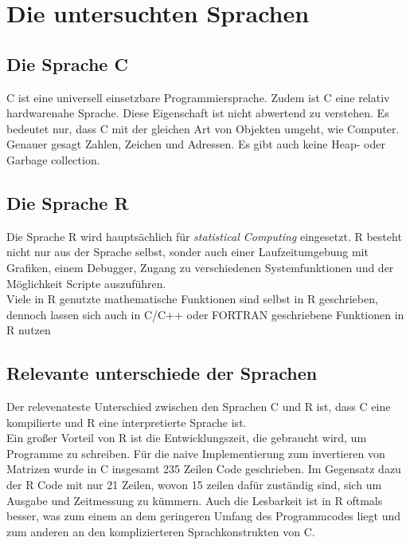 %
\chapter{Die untersuchten Sprachen}
\section{Die Sprache C}
C ist eine universell einsetzbare Programmiersprache. Zudem ist C eine relativ hardwarenahe Sprache. Diese Eigenschaft ist nicht abwertend zu verstehen. Es bedeutet nur, dass C mit der gleichen Art von Objekten umgeht, wie Computer. Genauer gesagt Zahlen, Zeichen und Adressen. Es gibt auch keine Heap- oder Garbage collection.\cite{Kernighan.1988}
\section{Die Sprache R}
Die Sprache R wird hauptsächlich für \emph{statistical Computing} eingesetzt. R besteht nicht nur aus der Sprache selbst, sonder auch einer Laufzeitumgebung mit Grafiken, einem Debugger, Zugang zu verschiedenen Systemfunktionen und der Möglichkeit Scripte auszuführen.\\
Viele in R genutzte mathematische Funktionen sind selbst in R geschrieben, dennoch lassen sich auch in C/C++ oder FORTRAN geschriebene Funktionen in R nutzen\cite{.05.10.2017}

\section{Relevante unterschiede der Sprachen}
Der relevenateste Unterschied zwischen den Sprachen C und R ist, dass C eine kompilierte und R eine interpretierte Sprache ist.\\
Ein großer Vorteil von R ist die Entwicklungszeit, die gebraucht wird, um Programme zu schreiben.
Für die naive Implementierung zum invertieren von Matrizen wurde in C insgesamt 235 Zeilen Code geschrieben. Im Gegensatz dazu der R Code mit nur 21 Zeilen, wovon 15 zeilen dafür zuständig sind, sich um Ausgabe und Zeitmessung zu kümmern. Auch die Lesbarkeit ist in R oftmals besser, was zum einem an dem geringeren Umfang des Programmcodes liegt und zum anderen an den komplizierteren Sprachkonstrukten von C.

